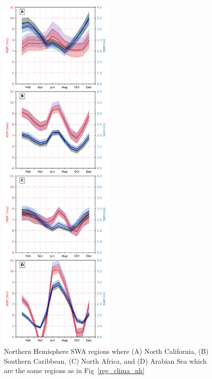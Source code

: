 \documentclass[12pt,twoside]{article}
\begin{document}
\begin{figure}[tbh]
\centering
\begin{minipage}{.5\textwidth}
  \centering
  \includegraphics[width=0.5\textwidth]{figs/regional_climatologies/SWARs_reg_clima_4x4_nh_ww3.png}
  \caption{Northern Hemisphere SWA regions where (A) North California, (B) Southern Caribbean, (C) North Africa, and (D) Arabian Sea which are the same regions as in Fig~\ref{reg_clima_nh}}
  \label{NH_model_comparison}
\end{minipage}%
\begin{minipage}{.5\textwidth}
  \centering

\end{minipage}
\end{figure}
\end{document}
